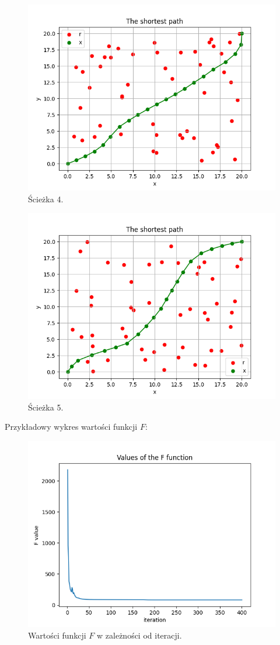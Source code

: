 \documentclass[11pt, leqno]{scrartcl}
\begin{document}
    \begin{figure}[H]
        \centering
        \includegraphics[width=0.7\linewidth]{path4.png}
        \caption{Ścieżka 4.}
    \end{figure}
    \begin{figure}[H]
        \centering
        \includegraphics[width=0.7\linewidth]{path5.png}
        \caption{Ścieżka 5.}
    \end{figure}
    Przykładowy wykres wartości funkcji $F$:
    \begin{figure}[H]
        \centering
        \includegraphics[width=0.7\linewidth]{F_values.png}
        \caption{Wartości funkcji $F$ w zależności od iteracji.}
    \end{figure}
\end{document}
